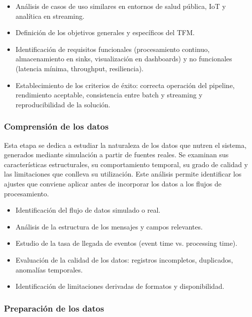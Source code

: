 \documentclass[12pt,a4paper]{article}
\providecommand{\tightlist}{%
  \setlength{\itemsep}{0pt}\setlength{\parskip}{0pt}}
\begin{document}
\begin{itemize}
    \tightlist
    \item
          Análisis de casos de uso similares en entornos de salud pública, IoT y analítica en streaming.
    \item
          Definición de los objetivos generales y específicos del TFM.
    \item
          Identificación de requisitos funcionales (procesamiento continuo, almacenamiento en sinks, visualización en dashboards) y no funcionales (latencia mínima, throughput, resiliencia).
    \item
          Establecimiento de los criterios de éxito: correcta operación del pipeline, rendimiento aceptable, consistencia entre batch y streaming y reproducibilidad de la solución.
\end{itemize}

\subsubsection{\texorpdfstring{Comprensión de los datos}{Comprensión de los datos}}\label{comprensiuxf3n-de-los-datos}

Esta etapa se dedica a estudiar la naturaleza de los datos que nutren el sistema, generados mediante simulación a partir de fuentes reales. Se examinan sus características estructurales, su comportamiento temporal, su grado de calidad y las limitaciones que conlleva su utilización. Este análisis permite identificar los ajustes que conviene aplicar antes de incorporar los datos a los flujos de procesamiento.

\begin{itemize}
    \tightlist
    \item
          Identificación del flujo de datos simulado o real.
    \item
          Análisis de la estructura de los mensajes y campos relevantes.
    \item
          Estudio de la tasa de llegada de eventos (event time vs. processing time).
    \item
          Evaluación de la calidad de los datos: registros incompletos, duplicados, anomalías temporales.
    \item
          Identificación de limitaciones derivadas de formatos y disponibilidad.
\end{itemize}

\subsubsection{\texorpdfstring{Preparación de los datos}{Preparación de los datos}}\label{preparaciuxf3n-de-los-datos}
\end{document}

